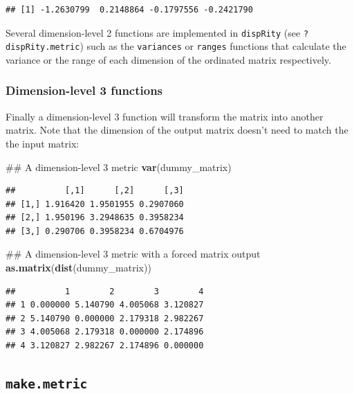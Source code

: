 \documentclass[]{book}
\newenvironment{Shaded}{\begin{snugshade}}{\end{snugshade}}
\newcommand{\KeywordTok}[1]{\textcolor[rgb]{0.13,0.29,0.53}{\textbf{#1}}}
\newcommand{\NormalTok}[1]{#1}
\theoremstyle{definition}
\theoremstyle{definition}
\theoremstyle{remark}
\begin{document}
\begin{verbatim}
## [1] -1.2630799  0.2148864 -0.1797556 -0.2421790
\end{verbatim}

Several dimension-level 2 functions are implemented in \texttt{dispRity}
(see \texttt{?dispRity.metric}) such as the \texttt{variances} or
\texttt{ranges} functions that calculate the variance or the range of
each dimension of the ordinated matrix respectively.

\subsubsection{Dimension-level 3
functions}\label{dimension-level-3-functions}

Finally a dimension-level 3 function will transform the matrix into
another matrix. Note that the dimension of the output matrix doesn't
need to match the the input matrix:

\begin{Shaded}
\begin{Highlighting}[]
\NormalTok{## A dimension-level 3 metric}
\KeywordTok{var}\NormalTok{(dummy_matrix)}
\end{Highlighting}
\end{Shaded}

\begin{verbatim}
##          [,1]      [,2]      [,3]
## [1,] 1.916420 1.9501955 0.2907060
## [2,] 1.950196 3.2948635 0.3958234
## [3,] 0.290706 0.3958234 0.6704976
\end{verbatim}

\begin{Shaded}
\begin{Highlighting}[]
\NormalTok{## A dimension-level 3 metric with a forced matrix output}
\KeywordTok{as.matrix}\NormalTok{(}\KeywordTok{dist}\NormalTok{(dummy_matrix))}
\end{Highlighting}
\end{Shaded}

\begin{verbatim}
##          1        2        3        4
## 1 0.000000 5.140790 4.005068 3.120827
## 2 5.140790 0.000000 2.179318 2.982267
## 3 4.005068 2.179318 0.000000 2.174896
## 4 3.120827 2.982267 2.174896 0.000000
\end{verbatim}

\subsection{\texorpdfstring{\texttt{make.metric}}{make.metric}}\label{make.metric}
\end{document}
